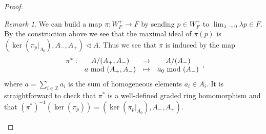 \documentclass[12pt]{article}
\numberwithin{equation}{section}
\theoremstyle{remark}
\newtheorem{remark}[theorem]{Remark}
\theoremstyle{definition}
\numberwithin{theorem}{section}
\def\beq{\begin{eqnarray}}
\def\eeq{\end{eqnarray}}
\def\Z{\mathbb{Z}}
\renewcommand{\1}{\mathbbm{1}}
\begin{document}
\begin{proof}
	\begin{remark} We can build a map $\pi:W^+_{F}\to F$ by sending $p\in W^+_{F}$ to $\lim_{\lambda \to 0} \lambda p\in F$. By the construction above we see that the maximal ideal of $\pi(p)$ is $(\ker(\pi_p|_{A_0}),A_-,A_+)\triangleleft A$. Thus we see that $\pi$ is induced by the map \beq\label{pistar}\begin{array}{cccc}\pi^*:&A/(A_+,A_-)&\to& A/(A_-)\\ &a \mbox{ \rm mod } (A_+,A_-)&\mapsto & a_0 \mbox{ mod } (A_-)\end{array},\eeq where $a=\sum_{i\in \Z} a_i$ is the sum of homogeneous elements $a_i\in A_i$. It is straightforward to check that $\pi^*$ is a well-defined graded ring homomorphism and that $(\pi^*)^{-1}(\ker(\pi_p))=(\ker(\pi_p|_{A_0}),A_-,A_+)$.   
	\end{remark}
	

\end{proof}
\end{document}
